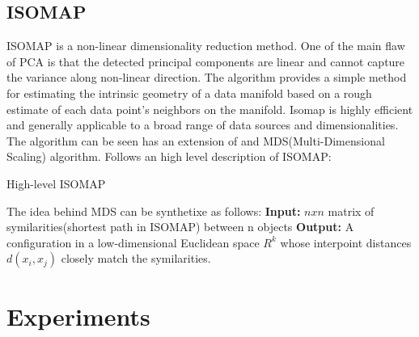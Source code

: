 \documentclass[a4paper,10pt]{article}
\begin{document}
  \subsection{ISOMAP}
    ISOMAP is a non-linear dimensionality reduction method. One of the main flaw of PCA is that the detected principal components are linear
    and cannot capture the variance along non-linear direction.\newline
    The algorithm provides a simple method for estimating the intrinsic geometry of a data manifold based on a rough estimate of each data point’s neighbors on the manifold. 
    Isomap is highly efficient and generally applicable to a broad range of data sources and dimensionalities.\newline
    The algorithm can be seen has an extension of and MDS(Multi-Dimensional Scaling) algorithm.\newline
    Follows an high level description of ISOMAP:\newline\newline
    \begin{algorithm}[H]
      
      \caption{High-level ISOMAP}
    \end{algorithm}
    \vspace{2mm}
    \noindent The idea behind MDS can be synthetixe as follows:\newline
    \textbf{Input:} $n x n$ matrix of symilarities(shortest path in ISOMAP) between n objects\newline
    \textbf{Output:} A configuration in a low-dimensional Euclidean space $R^k$ whose interpoint distances $d(x_i,x_j)$ closely match the symilarities.
    
  
\section{Experiments}
\end{document}
